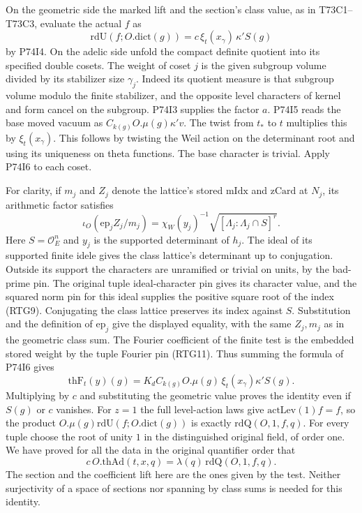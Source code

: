 On the geometric side the marked lift and the section's class
value, as in T73C1--T73C3, evaluate the actual $f$ as
\[
       \mathrm{rdU}(f;O.\mathrm{dict}(g))
        =c\,\xi_t(x_\gamma)\,\kappa' S(g)
\]
by P74I4. On the adelic side unfold the compact definite quotient
into its specified double cosets. The weight of coset $j$ is the
given subgroup volume divided by its stabilizer size $\gamma_j$.
Indeed its quotient measure is that subgroup volume modulo the
finite stabilizer, and the opposite level characters of kernel and
form cancel on the subgroup. P74I3 supplies the factor $a$. P74I5
reads the base moved vacuum as
$C_{k(g)}O.\mu(g)\kappa' v$. The twist from $t_*$ to $t$ multiplies
this by $\xi_t(x_\gamma)$. This follows by twisting the Weil action
on the determinant root and using its uniqueness on theta functions. The base character is trivial. Apply P74I6 to each coset.

For clarity, if $m_j$ and $Z_j$ denote the lattice's stored
$\mathrm{mIdx}$ and $\mathrm{zCard}$ at $N_j$, its arithmetic
factor satisfies
\[
  \iota_O(\mathrm{ep}_j Z_j/m_j)
     =\chi_W(y_j)^{-1}\sqrt{[\Lambda_j:\Lambda_j\cap S]^r}.
\]
Here $S=\mathcal O_E^n$ and $y_j$ is the supported determinant
of $h_j$. The ideal of its supported finite idele gives the
class lattice's determinant up to conjugation. Outside its support
the characters are unramified or trivial on units, by the bad-prime
pin. The original tuple ideal-character pin gives its character
value, and the squared norm pin for this ideal supplies the positive
square root of the index (RTG9). Conjugating the class lattice
preserves its index against $S$. Substitution and the definition of
$\mathrm{ep}_j$ give the displayed equality, with the same
$Z_j,m_j$ as in the geometric class sum. The Fourier coefficient
of the finite test is the embedded stored weight by the tuple
Fourier pin (RTG11). Thus summing the formula of P74I6 gives
\[
 \mathrm{thF}_t(y)(g)=K_d C_{k(g)}O.\mu(g)\,
                         \xi_t(x_\gamma)\kappa' S(g).
\]
Multiplying by $c$ and substituting the geometric value proves the
identity even if $S(g)$ or $c$ vanishes. For $z=1$ the full
level-action laws give $\mathrm{actLev}(1)f=f$, so the product
$O.\mu(g)\mathrm{rdU}(f;O.\mathrm{dict}(g))$ is exactly
$\mathrm{rdQ}(O,1,f,q)$. For every tuple choose the root of unity
$1$ in the distinguished original field, of order one. We have
proved for all the data in the original quantifier order that
\[
      c\,O.\mathrm{thAd}(t,x,q)
        =\lambda(q)\,\mathrm{rdQ}(O,1,f,q).
\]
The section and the coefficient lift here are the ones given by the
test. Neither surjectivity of a space of sections nor spanning by
class sums is needed for this identity.
